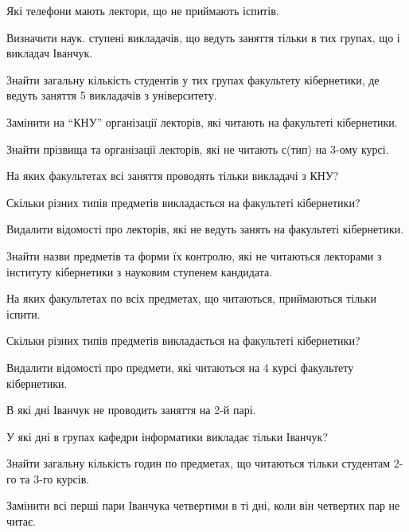 \begin{card}
    \item Які телефони мають лектори, що не приймають іспитів.
    \item Визначити наук. ступені викладачів, що ведуть заняття тільки в тих групах, що і викладач Іванчук.
    \item Знайти загальну кількість студентів у тих групах факультету кібернетики, де ведуть заняття 5 викладачів з університету.
    \item Замінити на ``КНУ'' організації лекторів, які читають на факультеті кібернетики.
\end{card}

\begin{card}
    \item Знайти прізвища та організації лекторів, які не читають с (тип) на 3-ому курсі.
    \item На яких факультетах всі заняття проводять тільки викладачі з КНУ?
    \item Скільки різних типів предметів викладається на факультеті кібернетики?
    \item Видалити відомості про лекторів, які не ведуть занять на факультеті кібернетики.
\end{card}

\begin{card}
    \item Знайти назви предметів та форми їх контролю, які не читаються лекторами з інституту кібернетики з науковим ступенем кандидата.
    \item На яких факультетах по всіх предметах, що читаються, приймаються тільки іспити.
    \item Скільки різних типів предметів викладається на факультеті кібернетики?
    \item Видалити відомості про предмети, які читаються на 4 курсі факультету кібернетики.
\end{card}

\begin{card}
    \item В які дні Іванчук не проводить заняття на 2-й парі.
    \item У які дні в групах кафедри інформатики викладає тільки Іванчук?
    \item Знайти загальну кількість годин по предметах, що читаються тільки студентам 2-го та 3-го курсів.
    \item Замінити всі перші пари Іванчука четвертими в ті дні, коли він четвертих пар не читає.
\end{card}

